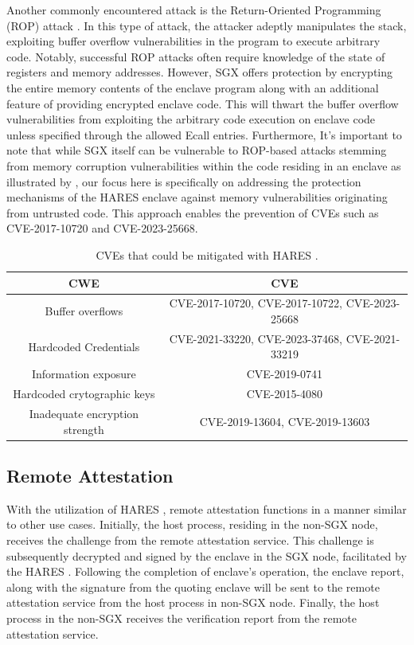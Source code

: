\documentclass[article, doublespace,nopageskip]{VTthesis} %
\newcommand{\monitor}{HARES }
\begin{document}
    Another commonly encountered attack is the Return-Oriented Programming (ROP) attack \cite{Remote-procedure-call}. In this type of attack, the attacker adeptly manipulates the stack, exploiting buffer overflow vulnerabilities in the program to execute arbitrary code. Notably, successful ROP attacks often require knowledge of the state of registers and memory addresses. However, SGX offers protection by encrypting the entire memory contents of the enclave program along with an additional feature of providing encrypted enclave code. This will thwart the buffer overflow vulnerabilities from exploiting the arbitrary code execution on enclave code unless specified through the allowed Ecall entries. Furthermore, It's important to note that while SGX itself can be vulnerable to ROP-based attacks stemming from memory corruption vulnerabilities within the code residing in an enclave as illustrated by \cite{ROP-paper}, our focus here is specifically on addressing the protection mechanisms of the \monitor enclave against memory vulnerabilities originating from untrusted code. This approach enables the prevention of CVEs such as CVE-2017-10720 and CVE-2023-25668.

    \begin{table}[t]
    \centering
    \footnotesize
    \caption{CVEs that could be mitigated with \monitor.}
    \begin{tabular}{| c | c |} \hline
          CWE & CVE \\ \hline \hline
        Buffer overflows & CVE-2017-10720, CVE-2017-10722, CVE-2023-25668\\ \hline  
        Hardcoded Credentials & CVE-2021-33220, CVE-2023-37468, CVE-2021-33219\\ \hline
        Information exposure & CVE-2019-0741 \\ \hline
        Hardcoded crytographic keys & CVE-2015-4080 \\ \hline
        Inadequate encryption strength & CVE-2019-13604, CVE-2019-13603 \\ \hline
    \end{tabular}
    \label{t:CVEs}
    \end{table}

    \subsection{Remote Attestation} \label{remote attestation}
    With the utilization of \monitor, remote attestation functions in a manner similar to other use cases. Initially, the host process, residing in the non-SGX node, receives the challenge from the remote attestation service. This challenge is subsequently decrypted and signed by the enclave in the SGX node, facilitated by the \monitor. Following the completion of enclave’s operation, the enclave report, along with the signature from the quoting enclave will be sent to the remote attestation service from the host process in non-SGX node. Finally, the host process in the non-SGX receives the verification report from the remote attestation service.
\end{document}
